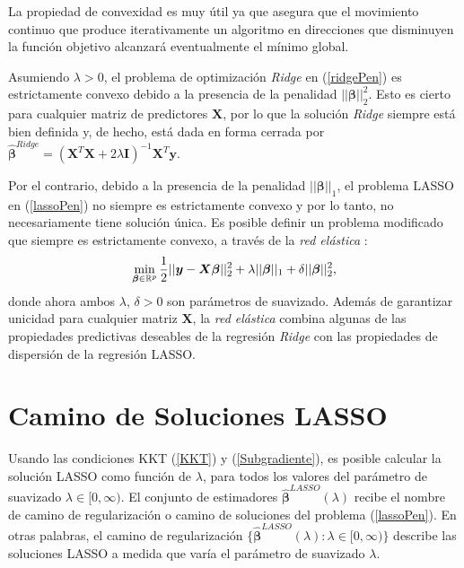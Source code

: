 \documentclass[a4paper,12pt]{report}
\begin{document}
La propiedad de convexidad es muy útil ya que asegura que el movimiento continuo que produce iterativamente un algoritmo en direcciones que disminuyen la función objetivo alcanzará eventualmente el mínimo global.

Asumiendo $\lambda > 0$, el problema de optimización \textit{Ridge} en (\ref{ridgePen}) es estrictamente convexo debido a la presencia de la penalidad $||\boldsymbol{\beta}||_2^2$. Esto es cierto para cualquier matriz de predictores $\boldsymbol{X}$, por lo que la solución \textit{Ridge} siempre está bien definida y, de hecho, está dada en forma cerrada por $\boldsymbol{\hat{\beta}}^{Ridge}=(\boldsymbol{X}^T\boldsymbol{X}+2\lambda \boldsymbol{I})^{-1}\boldsymbol{X}^T\boldsymbol{y}$.

Por el contrario, debido a la presencia de la penalidad $||\boldsymbol{\beta}||_1$, el problema LASSO en (\ref{lassoPen}) no siempre es estrictamente convexo y por lo tanto, no necesariamente tiene solución única. Es posible definir un problema modificado que siempre es estrictamente convexo, a través de la \textit{red elástica} \citep{zou2005regularization}:
\begin{equation}
\label{ElasticNet}
\operatornamewithlimits{min}\limits_{\boldsymbol{\beta} \in \mathbb{R}^p} \frac{1}{2}||\boldsymbol{y}-\boldsymbol{X}\boldsymbol{\beta}||_2^2+\lambda ||\boldsymbol{\beta}||_1+\delta ||\boldsymbol{\beta}||_2^2,
\end{equation}
donde ahora ambos $\lambda$, $\delta > 0$ son parámetros de suavizado. Además de garantizar unicidad para cualquier matriz $\boldsymbol{X}$, la \textit{red elástica} combina algunas de las propiedades predictivas deseables de la regresión \textit{Ridge} con las propiedades de dispersión de la regresión LASSO.

\section{Camino de Soluciones LASSO}
Usando las condiciones KKT (\ref{KKT}) y (\ref{Subgradiente}), es posible calcular la solución LASSO como función de $\lambda$, para todos los valores del parámetro de suavizado $\lambda \in [0,\infty)$. El conjunto de estimadores $\boldsymbol{\hat{\beta}}^{LASSO}(\lambda)$ recibe el nombre de camino de regularización o camino de soluciones del problema (\ref{lassoPen}). En otras palabras, el camino de regularización $\{\boldsymbol{\hat{\beta}}^{LASSO}(\lambda):\lambda\in [0,\infty)\}$ describe las soluciones LASSO a medida que varía el parámetro de suavizado $\lambda$.
\end{document}
